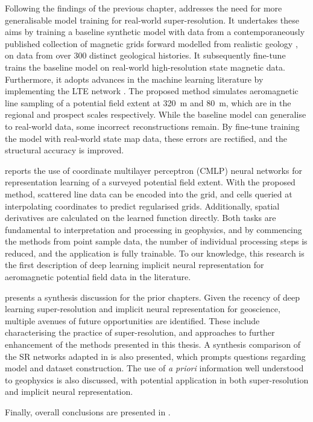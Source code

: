 Following the findings of the previous chapter,  addresses the need for more generalisable model training for real-world super-resolution.
It undertakes these aims by training a baseline synthetic model with data from a contemporaneously published collection of magnetic grids forward modelled from realistic geology \parencite{jessellNoddyverseMassiveData2022}, on data from over \num{300} distinct geological histories.
It subsequently fine-tune trains the baseline model on real-world high-resolution state magnetic data.
Furthermore, it adopts advances in the machine learning literature by implementing the LTE network \parencite{leeLocalTextureEstimator2022}.
The proposed method simulates aeromagnetic line sampling of a potential field extent at \qty{320}{\m} and \qty{80}{\m}, which are in the regional and prospect scales respectively.
While the baseline model can generalise to real-world data, some incorrect reconstructions remain.
By fine-tune training the model with real-world state map data, these errors are rectified, and the structural accuracy is improved.

 reports the use of coordinate multilayer perceptron (CMLP) neural networks for representation learning of a surveyed potential field extent.
With the proposed method, scattered line data can be encoded into the grid, and cells queried at interpolating coordinates to predict regularised grids.
Additionally, spatial derivatives are calculated on the learned function directly.
Both tasks are fundamental to interpretation and processing in geophysics, and by commencing the methods from point sample data, the number of individual processing steps is reduced, and the application is fully trainable.
To our knowledge, this research is the first description of deep learning implicit neural representation for aeromagnetic potential field data in the literature.

 presents a synthesis discussion for the prior chapters. Given the recency of deep learning super-resolution and implicit neural representation for geoscience, multiple avenues of future opportunities are identified.
These include characterising the practice of super-resolution, and approaches to further enhancement of the methods presented in this thesis.
A synthesis comparison of the SR networks adapted in  is also presented, which prompts questions regarding model and dataset construction.
The use of \emph{a priori} information well understood to geophysics is also discussed, with potential application in both super-resolution and implicit neural representation.

Finally, overall conclusions are presented in .

\printbibliography{}

% 